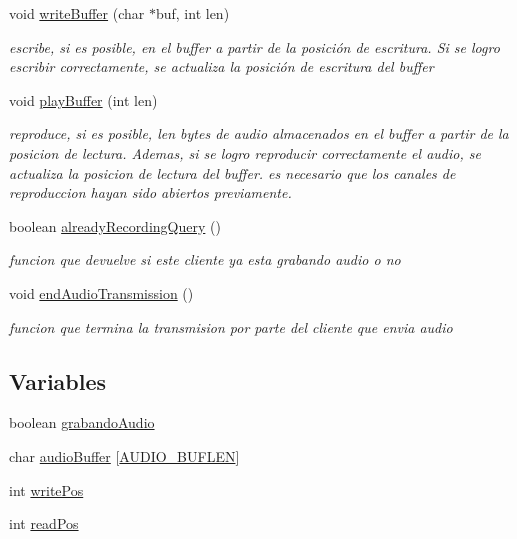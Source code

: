 \begin{DoxyCompactItemize}
void \hyperlink{_g-2301-05-_p2-audio_8c_a197e00439b5ca776c65aba209872f76a}{write\-Buffer} (char $\ast$buf, int len)
\begin{DoxyCompactList}\small\item\em escribe, si es posible, en el buffer a partir de la posición de escritura. Si se logro escribir correctamente, se actualiza la posición de escritura del buffer \end{DoxyCompactList}\item 
void \hyperlink{_g-2301-05-_p2-audio_8c_a46e32d8c31f4e0bed7c4a3dd7665ba73}{play\-Buffer} (int len)
\begin{DoxyCompactList}\small\item\em reproduce, si es posible, len bytes de audio almacenados en el buffer a partir de la posicion de lectura. Ademas, si se logro reproducir correctamente el audio, se actualiza la posicion de lectura del buffer. es necesario que los canales de reproduccion hayan sido abiertos previamente. \end{DoxyCompactList}\item 
boolean \hyperlink{_g-2301-05-_p2-audio_8c_a23e6ef186ace7452878618e453a12d6f}{already\-Recording\-Query} ()
\begin{DoxyCompactList}\small\item\em funcion que devuelve si este cliente ya esta grabando audio o no \end{DoxyCompactList}\item 
void \hyperlink{_g-2301-05-_p2-audio_8c_a2140fd94315d561f0df0972d18f144cc}{end\-Audio\-Transmission} ()
\begin{DoxyCompactList}\small\item\em funcion que termina la transmision por parte del cliente que envia audio \end{DoxyCompactList}\end{DoxyCompactItemize}
\subsection*{Variables}
\begin{DoxyCompactItemize}
\item 
boolean \hyperlink{_g-2301-05-_p2-audio_8c_a991a654ebc130040f9ca67c7a4c1956d}{grabando\-Audio}
\item 
char \hyperlink{_g-2301-05-_p2-audio_8c_a5910b24e625d530fb8ff50b0dcef805a}{audio\-Buffer} \mbox{[}\hyperlink{_g-2301-05-_p2-audio_8c_a88007cd1caf5537d34251bcc91704402}{A\-U\-D\-I\-O\-\_\-\-B\-U\-F\-L\-E\-N}\mbox{]}
\item 
int \hyperlink{_g-2301-05-_p2-audio_8c_a8693afd6c4562264a3cb24736198e435}{write\-Pos}
\item 
int \hyperlink{_g-2301-05-_p2-audio_8c_ae80c1a9f4c0091ea6d461132b9457a4c}{read\-Pos}
\end{DoxyCompactItemize}


